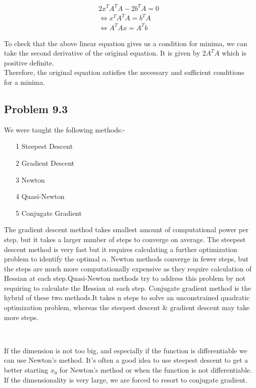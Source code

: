 \documentclass[letterpaper,12pt]{article}
\theoremstyle{definition}
\begin{document}
\begin{align*}
2x^TA^TA - 2b^TA = 0 \\
\iff x^TA^TA = b^TA \\
\iff A^TAx = A^Tb
\end{align*}
\begin{flushleft}
To check that the above linear equation gives us a  condition for minima, we can take the second derivative of the original equation. It is given by $ 2A^TA $ which is positive definite.\\
\vspace{2mm}
Therefore, the original equation satisfies the necessary and sufficient conditions for a minima. 
\end{flushleft}
\subsection*{Problem 9.3}

We were taught the following methods:-
\begin{itemize}
    \item[1] Steepest Descent
\item[2] Gradient Descent
\item[3] Newton
\item[4] Quasi-Newton
\item[5] Conjugate Gradient
\end{itemize}

\begin{flushleft}
The gradient descent method takes smallest amount of computational power per step, but it takes a larger number of steps to converge on average. The steepest descent method is very fast but it requires calculating a further optimization problem to identify the optimal $\alpha$. Newton methods converge in fewer steps, but the steps are much more computationally expensive as they require calculation of Hessian at each step.Quasi-Newton methods try to address this problem by not requiring to calculate the Hessian at each step.  Conjugate gradient method is the hybrid of these  two methods.It takes n steps to solve an unconstrained quadratic optimization problem, whereas the steepest descent \& gradient descent may take more steps.
\end{flushleft}
\\
\begin{flushleft}
If the dimension is not too big, and especially if the function is differentiable we can use Newton's method. It's often a good idea to use steepest descent to get a better starting $x_0$ for Newton's method or when the function is not differentiable. If the dimensionality is very large, we are forced to resort to conjugate gradient.
\end{flushleft}
\end{document}
